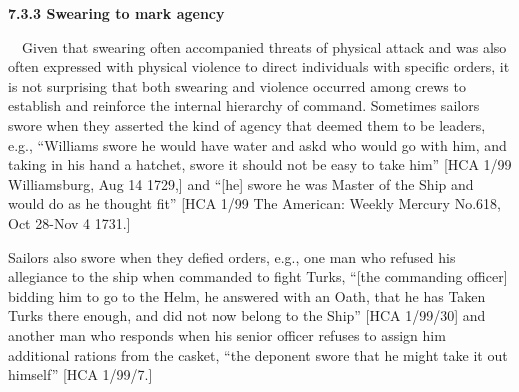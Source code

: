 \begin{styleStandard}
\textbf{7.3.3 Swearing to mark agency}
\end{styleStandard}

\begin{styleStandard}
\ \ Given that swearing often accompanied threats of physical attack and was also often expressed with physical violence to direct individuals with specific orders, it is not surprising that both swearing and violence occurred among crews to establish and reinforce the internal hierarchy of command. Sometimes sailors swore when they asserted the kind of agency that deemed them to be leaders, e.g., “Williams swore he would have water and askd who would go with him, and taking in his hand a hatchet, swore it should not be easy to take him” [HCA 1/99 Williamsburg, Aug 14 1729,] and “[he] swore he was Master of the Ship and would do as he thought fit” [HCA 1/99 The American: Weekly Mercury No.618, Oct 28-Nov 4 1731.] 
\end{styleStandard}

\begin{styleStandard}
Sailors also swore when they defied orders, e.g., one man who refused his allegiance to the ship when commanded to fight Turks, “[the commanding officer] bidding him to go to the Helm, he answered with an Oath, that he has Taken Turks there enough, and did not now belong to the Ship” [HCA 1/99/30] and another man who responds when his senior officer refuses to assign him additional rations from the casket, “the deponent swore that he might take it out himself” [HCA 1/99/7.] 
\end{styleStandard}

